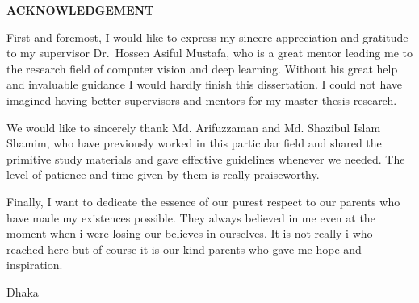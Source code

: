 \begin{center}
  \textbf{{\Large ACKNOWLEDGEMENT}}\\[60pt]
\end{center}

First and foremost, I would like to express my sincere appreciation and gratitude to my supervisor Dr.\ Hossen Asiful Mustafa, who is a great mentor leading me to the research field of computer vision and deep learning. Without his great help and invaluable guidance I would hardly finish this dissertation. I could not have imagined having better supervisors and mentors for my master thesis research.

We would like to sincerely thank Md. Arifuzzaman and Md. Shazibul Islam Shamim, who have previously worked in this particular field and shared the primitive study materials and gave effective guidelines whenever we needed. The level of patience and time given by them is really praiseworthy.

Finally, I want to dedicate the essence of our purest respect to our parents who have made my existences possible. They always believed in me even at the moment when i were losing our believes in ourselves. It is not really i who reached here but of course it is our kind parents who gave me hope and inspiration.

\vspace*{20.0mm}

\begin{minipage}[t]{0.2\textwidth}
  Dhaka\par
  \thesisdate
\end{minipage}%
\hfill
\begin{minipage}[t]{0.45\textwidth}
  \begin{enumerate}
    \vspace{-0.75\baselineskip}
  \end{enumerate}
\end{minipage}

\endinput
